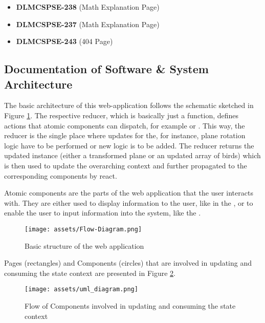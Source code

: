 \begin{itemize}
\item {\textbf{\color{TAGpurple}\ttfamily DLMCSPSE-238 }}(Math Explanation Page)
\item {\textbf{\color{TAGpurple}\ttfamily DLMCSPSE-237 }}(Math Explanation Page)
\item {\textbf{\color{TAGpurple}\ttfamily DLMCSPSE-243 }}(404 Page)
\end{itemize}

\newpage
\subsection{Documentation of Software \& System Architecture}

The basic architecture of this web-application follows the schematic sketched in Figure \ref{fig:flow_chart}.
The respective reducer, which is basically just a function, defines actions that atomic components can dispatch, for example  or . This way, the reducer is the single place where updates for the, for instance, plane rotation logic have to be performed or new logic is to be added. The reducer returns the updated instance (either a transformed plane or an updated array of birds) which is then used to update the overarching context and further propagated to the corresponding components by react.

Atomic components are the parts of the web application that the user interacts with. They are either used to display information to the user, like in the , or to enable the user to input information into the system, like the .

\begin{figure}[!h]
  \centering
  \caption{Basic structure of the web application}
  \texttt{[image: assets/Flow-Diagram.png]}
  \label{fig:flow_chart}
\end{figure}

Pages (rectangles) and Components (circles) that are involved in updating and consuming the state context are presented in Figure  \ref{fig:uml_diagram}.

\begin{figure}[!h]
  \centering
  \caption{Flow of Components involved in updating and consuming the state context}
  \texttt{[image: assets/uml\_diagram.png]}
  \label{fig:uml_diagram}
\end{figure}

